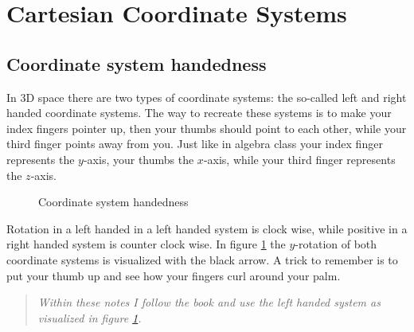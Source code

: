 \section{Cartesian Coordinate Systems}

\subsection{Coordinate system handedness}

In 3D space there are two types of coordinate systems: the so-called left and right handed coordinate systems. The way to recreate these systems is to make your index fingers pointer up, then your thumbs should point to each other, while your third finger points away from you. Just like in algebra class your index finger represents the $y$-axis, your thumbs the $x$-axis, while your third finger represents the $z$-axis.

\begin{figure}[H]
\centering
\caption{Coordinate system handedness}
\label{fig:coordinate-system-handedness}
\end{figure}

Rotation in a left handed in a left handed system is clock wise, while positive in a right handed system is counter clock wise. In figure  \ref{fig:coordinate-system-handedness} the $y$-rotation of both  coordinate systems is visualized with the black arrow. A trick to remember is to put your thumb up and see how your fingers curl around your palm.

\begin{quote}
\emph{Within these notes I follow the book and use the left handed system as visualized in figure \ref{fig:coordinate-system-handedness}.}
\end{quote}

